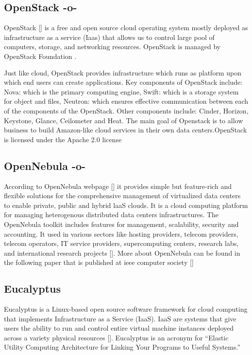 \subsection{OpenStack -o-}
 
OpenStack [\cite{www-OpenStack.org}] is a free and open source cloud
operating system mostly deployed as infrastructure as a service (Iaas)
that allows us to control large pool of computers, storage, and
networking resources.  OpenStack is managed by OpenStack Foundation
\cite{www-OpenStack-Found}.
     
Just like cloud, OpenStack provides infrastructure which runs as
platform upon which end users can create applications. Key components
of OpenStack include: Nova: which is the primary computing engine,
Swift: which is a storage system for object and files, Neutron: which
ensures effective communication between each of the components of the
OpenStack. Other components include: Cinder, Horizon, Keystone,
Glance, Ceilometer and Heat. The main goal of Openstack is to allow
business to build Amazon-like cloud services in their own data
centers.OpenStack is licensed under the Apache 2.0 license
\cite{www-apache-license}
  
\subsection{OpenNebula -o-}

According to OpenNebula webpage [\cite{www-opennebula-org}] it provides
simple but feature-rich and flexible solutions for the comprehensive
management of virtualized data centers to enable private, public and
hybrid laaS clouds. It is a cloud computing platform for managing
heterogenous distributed data centers infrastructures. The OpenNebula
toolkit includes features for management, scalability, security and
accounting. It used in various sectors like hosting providers, telecom
providers, telecom operators, IT service providers, supercomputing
centers, research labs, and international research
projects [\cite{www-opennebula-wiki}]. More about OpenNebula can be
found in the following paper that is published at ieee computer
society [\cite{paper-opennebula}]
     
\subsection{Eucalyptus}

Eucalyptus is a Linux-based open source software framework for cloud
computing that implements Infrastructure as a Service (IaaS). IaaS are
systems that give users the ability to run and control entire virtual
machine instances deployed across a variety physical
resources [\cite{paper-eucalyptus}]. Eucalyptus is an acronym for
``Elastic Utility Computing Architecture for Linking Your Programs to
Useful Systems.''

